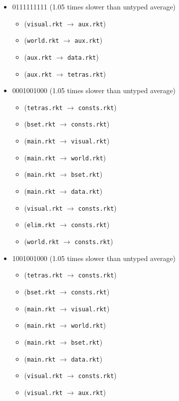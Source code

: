 \documentclass{article}
\newcommand{\mono}[1]{\texttt{#1}}
\begin{document}
\begin{itemize}
\begin{itemize}
  \end{itemize}
\item 0111111111 (1.05 times slower than untyped average)
  \begin{itemize}
  \item (\mono{visual.rkt} $\rightarrow$ \mono{aux.rkt})
  \item (\mono{world.rkt} $\rightarrow$ \mono{aux.rkt})
  \item (\mono{aux.rkt} $\rightarrow$ \mono{data.rkt})
  \item (\mono{aux.rkt} $\rightarrow$ \mono{tetras.rkt})
  \end{itemize}
\item 0001001000 (1.05 times slower than untyped average)
  \begin{itemize}
  \item (\mono{tetras.rkt} $\rightarrow$ \mono{consts.rkt})
  \item (\mono{bset.rkt} $\rightarrow$ \mono{consts.rkt})
  \item (\mono{main.rkt} $\rightarrow$ \mono{visual.rkt})
  \item (\mono{main.rkt} $\rightarrow$ \mono{world.rkt})
  \item (\mono{main.rkt} $\rightarrow$ \mono{bset.rkt})
  \item (\mono{main.rkt} $\rightarrow$ \mono{data.rkt})
  \item (\mono{visual.rkt} $\rightarrow$ \mono{consts.rkt})
  \item (\mono{elim.rkt} $\rightarrow$ \mono{consts.rkt})
  \item (\mono{world.rkt} $\rightarrow$ \mono{consts.rkt})
  \end{itemize}
\item 1001001000 (1.05 times slower than untyped average)
  \begin{itemize}
  \item (\mono{tetras.rkt} $\rightarrow$ \mono{consts.rkt})
  \item (\mono{bset.rkt} $\rightarrow$ \mono{consts.rkt})
  \item (\mono{main.rkt} $\rightarrow$ \mono{visual.rkt})
  \item (\mono{main.rkt} $\rightarrow$ \mono{world.rkt})
  \item (\mono{main.rkt} $\rightarrow$ \mono{bset.rkt})
  \item (\mono{main.rkt} $\rightarrow$ \mono{data.rkt})
  \item (\mono{visual.rkt} $\rightarrow$ \mono{consts.rkt})
  \item (\mono{visual.rkt} $\rightarrow$ \mono{aux.rkt})

\end{itemize}
\end{itemize}
\end{document}

